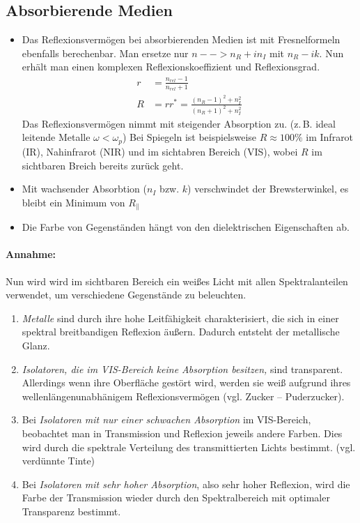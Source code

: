  
 \subsection{Absorbierende Medien}
 \begin{itemize}
 	\item Das Reflexionsvermögen bei absorbierenden Medien ist mit Fresnelformeln ebenfalls berechenbar. Man ersetze nur $n --> n_R+in_I$ mit $n_R-ik$. Nun erhält man einen komplexen Reflexionskoeffizient und Reflexionsgrad.
 	\begin{align*}
 		r&=\frac{n_{rel}-1}{n_{rel}+1}\\
 		R&=rr^*=\frac{(n_R-1)^2+n_I^2}{(n_R+1)^2+n_I^2}
 	\end{align*}
 	Das Reflexionsvermögen nimmt mit steigender Absorption zu. (z.\,B. ideal leitende Metalle $\omega<\omega_p$) Bei Spiegeln ist beispielsweise $R\approx100\%$ im Infrarot (IR), Nahinfrarot (NIR) und im sichtabren Bereich (VIS), wobei $R$ im sichtbaren Breich bereits zurück geht.
 	\item Mit wachsender Absorbtion ($n_I$ bzw. $k$) verschwindet der Brewsterwinkel, es bleibt ein Minimum von $R_{\parallel}$
 	\item Die Farbe von Gegenständen hängt von den dielektrischen Eigenschaften ab.
 \end{itemize}
 \paragraph{Annahme:}Nun wird wird im sichtbaren Bereich ein weißes Licht mit allen Spektralanteilen verwendet, um verschiedene Gegenstände zu beleuchten.
 \begin{enumerate}
 	\item \emph{Metalle} sind durch ihre hohe Leitfähigkeit charakterisiert, die sich in einer spektral breitbandigen Reflexion äußern. Dadurch entsteht der metallische Glanz.
 	\item \emph{Isolatoren, die im VIS-Bereich keine Absorption besitzen,} sind transparent. Allerdings wenn ihre Oberfläche gestört wird, werden sie weiß aufgrund ihres wellenlängenunabhänigem Reflexionsvermögen (vgl. Zucker -- Puderzucker).
 	\item Bei \emph{Isolatoren mit nur einer schwachen Absorption }im VIS-Bereich, beobachtet man in Transmission und Reflexion jeweils andere Farben. Dies wird durch die spektrale Verteilung des transmittierten Lichts bestimmt. (vgl. verdünnte Tinte)
 	\item Bei \emph{Isolatoren mit sehr hoher Absorption}, also sehr hoher Reflexion, wird die Farbe der Transmission wieder durch den Spektralbereich mit optimaler Transparenz bestimmt.
 \end{enumerate}